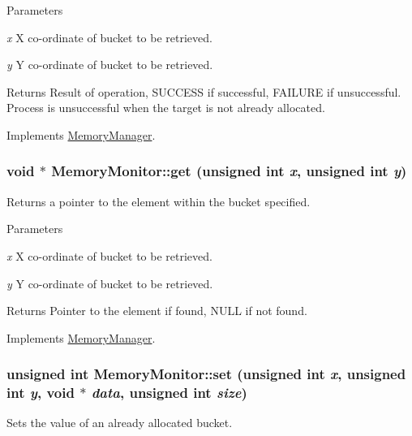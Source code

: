 \begin{DoxyParams}{Parameters}
\item[{\em x}]X co-\/ordinate of bucket to be retrieved. \item[{\em y}]Y co-\/ordinate of bucket to be retrieved.\end{DoxyParams}
\begin{DoxyReturn}{Returns}
Result of operation, SUCCESS if successful, FAILURE if unsuccessful. Process is unsuccessful when the target is not already allocated. 
\end{DoxyReturn}


Implements \hyperlink{classMemoryManager_af63cdf4a0fdbd5eb328e13959ff4c5b5}{MemoryManager}.

\hypertarget{classMemoryMonitor_a547ef93f8d1664f7f4a5c41f4a922caa}{
\subsubsection[{get}]{\setlength{\rightskip}{0pt plus 5cm}void $\ast$ MemoryMonitor::get (unsigned int {\em x}, \/  unsigned int {\em y})}}
\label{classMemoryMonitor_a547ef93f8d1664f7f4a5c41f4a922caa}
Returns a pointer to the element within the bucket specified.


\begin{DoxyParams}{Parameters}
\item[{\em x}]X co-\/ordinate of bucket to be retrieved. \item[{\em y}]Y co-\/ordinate of bucket to be retrieved.\end{DoxyParams}
\begin{DoxyReturn}{Returns}
Pointer to the element if found, NULL if not found. 
\end{DoxyReturn}


Implements \hyperlink{classMemoryManager_ad1786ab026c6077405e3c963e05d4a26}{MemoryManager}.

\hypertarget{classMemoryMonitor_a57b86aac696c79f2c3018ee9878e15a3}{
\subsubsection[{set}]{\setlength{\rightskip}{0pt plus 5cm}unsigned int MemoryMonitor::set (unsigned int {\em x}, \/  unsigned int {\em y}, \/  void $\ast$ {\em data}, \/  unsigned int {\em size})}}
\label{classMemoryMonitor_a57b86aac696c79f2c3018ee9878e15a3}
Sets the value of an already allocated bucket.


